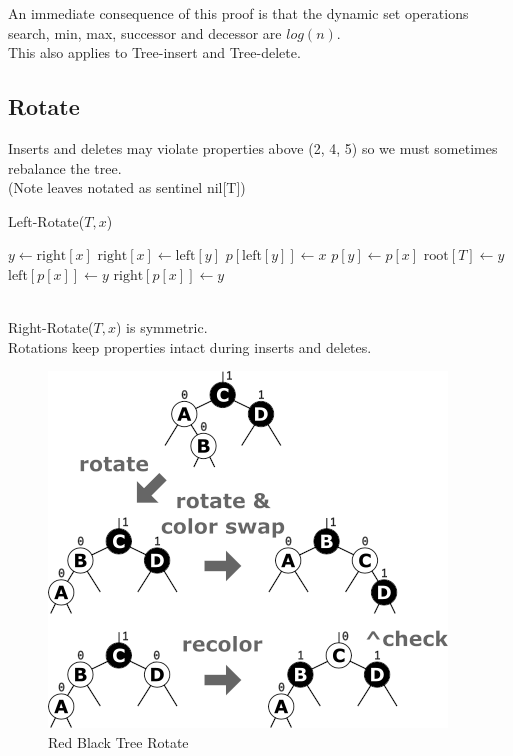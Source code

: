 \documentclass{article}
\begin{document}
An immediate consequence of this proof is that the dynamic set operations search, min, max, successor and decessor are $log(n)$.\\
This also applies to Tree-insert and Tree-delete.\\
\subsection{Rotate}
Inserts and deletes may violate properties above (2, 4, 5) so we must sometimes rebalance the tree.\\
(Note leaves notated as sentinel nil[T])\\
\begin{algorithm}
\caption{Left-Rotate($T, x$)}
\begin{algorithmic}[1]
    \STATE $y \gets \text{right}[x]$
    \STATE $\text{right}[x] \gets \text{left}[y]$
        \STATE $p[\text{left}[y]] \gets x$
    \ENDIF
    \STATE $p[y] \gets p[x]$
        \STATE $\text{root}[T] \gets y$
    \ELSE
            \STATE $\text{left}[p[x]] \gets y$
        \ELSE
            \STATE $\text{right}[p[x]] \gets y$
        \ENDIF
    \ENDIF
\end{algorithmic}
\end{algorithm}
\\
Right-Rotate($T,x$) is symmetric.\\
Rotations keep properties intact during inserts and deletes.
\begin{figure}[htp]
    \includegraphics[width=\textwidth]{RBTinsert.png}
    \caption{Red Black Tree Rotate}
    \label{tab:placeholder}
\end{figure}
\newpage
\end{document}
